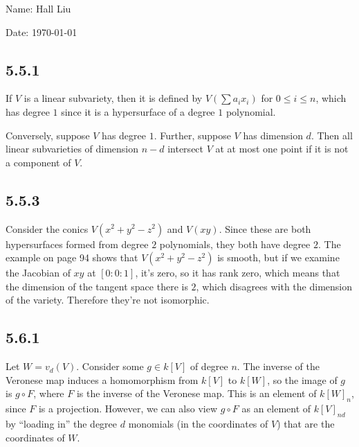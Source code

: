 \documentclass{article}
\begin{document}
Name: Hall Liu

Date: \today 
\vspace{1.5cm}
\subsection*{5.5.1}
If $V$ is a linear subvariety, then it is defined by $V(\sum a_ix_i)$ for $0\leq i\leq n$, which has degree $1$ since it is a hypersurface of a degree $1$ polynomial.

Conversely, suppose $V$ has degree $1$. Further, suppose $V$ has dimension $d$. Then all linear subvarieties of dimension $n-d$ intersect $V$ at at most one point if it is not a component of $V$. 
\subsection*{5.5.3}
Consider the conics $V(x^2+y^2-z^2)$ and $V(xy)$. Since these are both hypersurfaces formed from degree $2$ polynomials, they both have degree $2$. The example on page 94 shows that $V(x^2+y^2-z^2)$ is smooth, but if we examine the Jacobian of $xy$ at $[0:0:1]$, it's zero, so it has rank zero, which means that the dimension of the tangent space there is $2$, which disagrees with the dimension of the variety. Therefore they're not isomorphic.
\subsection*{5.6.1}
Let $W=v_d(V)$. Consider some $g\in k[V]$ of degree $n$. The inverse of the Veronese map induces a homomorphism from $k[V]$ to $k[W]$, so the image of $g$ is $g\circ F$, where $F$ is the inverse of the Veronese map. This is an element of $k[W]_n$, since $F$ is a projection. However, we can also view $g\circ F$ as an element of $k[V]_{nd}$ by ``loading in'' the degree $d$ monomials (in the coordinates of $V$) that are the coordinates of $W$. 
\end{document}

